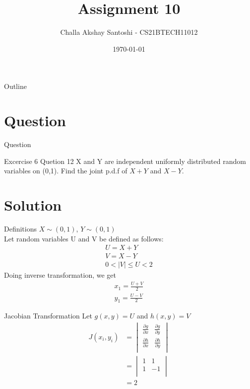 \documentclass{beamer}
\title{Assignment 10}
\author{Challa Akshay Santoshi - CS21BTECH11012}
\date{\today}
\begin{document}
\begin{frame}
    \titlepage 
\end{frame}

\logo{}


\begin{frame}{Outline}
    \tableofcontents
\end{frame}


\section{Question}
\begin{frame}{Question}
\begin{block}{Excercise 6 Quetion 12} X and Y are independent uniformly distributed random variables on (0,1). Find the joint p.d.f of $X+Y$ and $X-Y$.
    \end{block}
\end{frame}

\section{Solution}
\begin{frame}{Definitions}
$X \sim (0,1)$, $Y \sim (0,1)$\\
Let random variables U and V be defined as follows:
\begin{align}
    U = X + Y\\
    V = X - Y\\
    0 < |V| \leq U < 2
\end{align}
Doing inverse transformation, we get
\begin{align}
    x_1 = \frac{U + V}{2}\\
    y_1 = \frac{U - V}{2}
\end{align}
   
\end{frame}

\begin{frame}{Jacobian Transformation}
Let $g(x,y) = U$ and $h(x,y) = V$
\begin{align}
    J(x_i,y_i) &= \begin{vmatrix}
\frac{\partial{g}}{\partial{x}} & \frac{\partial{g}}{\partial{y}} \\ 
\frac{\partial{h}}{\partial{x}} & \frac{\partial{h}}{\partial{y}} \\
\end{vmatrix}\\
&= \begin{vmatrix}
1 & 1 \\ 
1 & -1 \\
\end{vmatrix}\\
&= 2
\end{align}
\end{frame}
\end{document}
